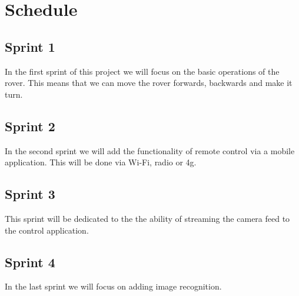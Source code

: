 \section{Schedule}

\subsection{Sprint 1}
In the first sprint of this project we will focus on the basic operations of the rover. This means that we can move the rover forwards, backwards and make it turn.

\subsection{Sprint 2}
In the second sprint we will add the functionality of remote control via a mobile application. This will be done via Wi-Fi, radio or 4g.

\subsection{Sprint 3}
This sprint will be dedicated to the the ability of streaming the camera feed to the control application.

\subsection{Sprint 4}
In the last sprint we will focus on adding image recognition.
